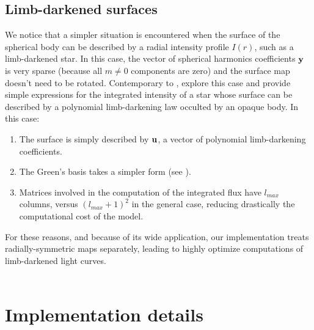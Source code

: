 \documentclass[modern]{aastex631}
\begin{document}
\subsection{Limb-darkened surfaces}
We notice that a simpler situation is encountered when the surface of the spherical body can be described by a radial intensity profile $I(r)$, such as a limb-darkened star. In this case, the vector of spherical harmonics coefficients ${\mathbf{y}}$ is very sparse (because all $m\neq0$ components are zero) and the surface map doesn't need to be rotated. Contemporary to \cite{starry}, \cite{Agol2020} explore this case and provide simple expressions for the integrated intensity of a star whose surface can be described by a polynomial limb-darkening law occulted by an opaque body. In this case:
\begin{enumerate}
    \item The surface is simply described by ${\mathbf{u}}$, a vector of polynomial limb-darkening coefficients.
    \item The Green's basis takes a simpler form (see \citealt[Eq. X]{Agol2020}).
    \item Matrices involved in the computation of the integrated flux have $l_{max}$ columns, versus $(l_{max}+1)^2$ in the general case, reducing drastically the computational cost of the model.
\end{enumerate}
For these reasons, and because of its wide application, our implementation treats radially-symmetric maps separately, leading to highly optimize computations of limb-darkened light curves.\\\\


\newpage
\section{Implementation details}\label{optimization}
\end{document}

